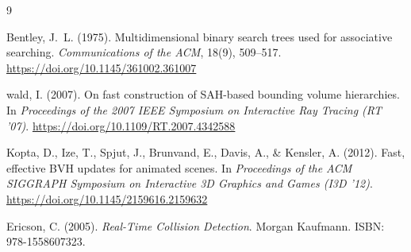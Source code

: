 \documentclass[12pt]{article}
\begin{document}
\begin{thebibliography}{9}

Bentley, J.~L. (1975).
\newblock Multidimensional binary search trees used for associative searching.
\newblock \textit{Communications of the ACM}, 18(9), 509--517.
\newblock \url{https://doi.org/10.1145/361002.361007}

wald, I. (2007).
\newblock On fast construction of SAH-based bounding volume hierarchies.
\newblock In \textit{Proceedings of the 2007 IEEE Symposium on Interactive Ray
Tracing (RT '07)}.
\newblock \url{https://doi.org/10.1109/RT.2007.4342588}

Kopta, D., Ize, T., Spjut, J., Brunvand, E., Davis, A., \& Kensler, A. (2012).
\newblock Fast, effective BVH updates for animated scenes.
\newblock In \textit{Proceedings of the ACM SIGGRAPH Symposium on Interactive
3D Graphics and Games (I3D '12)}.
\newblock \url{https://doi.org/10.1145/2159616.2159632}

Ericson, C. (2005).
\newblock \textit{Real-Time Collision Detection}.
\newblock Morgan Kaufmann.
\newblock ISBN: 978-1558607323.

\end{thebibliography}
\end{document}
